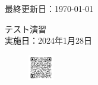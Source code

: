\documentclass[a4paper,11pt]{jsarticle}
\begin{document}
\begin{titlepage}
  \hfill {最終更新日：\today}
  \begin{center}
    {\Huge\gt テスト演習}\\ \vspace{\baselineskip}
    \textup{\large 実施日：2024年1月28日}\\ 
  \end{center}
  \vfill
  \begin{figure}[H]
    \includegraphics[width=0.1\textwidth]{../images/qrcode.png}
  \end{figure}
\end{titlepage}

\qPart
%
\calcPage

\qPart
%
\calcPage

\qPart
%
\clearpage

\brankPage
\end{document}
